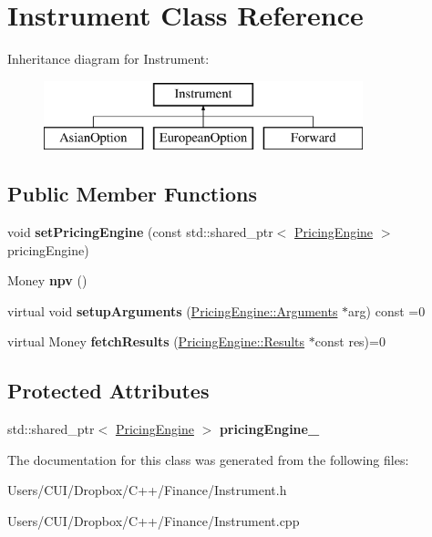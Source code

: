 \hypertarget{class_instrument}{}\section{Instrument Class Reference}
\label{class_instrument}
Inheritance diagram for Instrument\+:\begin{figure}[H]
\begin{center}
\leavevmode
\includegraphics[height=2.000000cm]{class_instrument}
\end{center}
\end{figure}
\subsection*{Public Member Functions}
\begin{DoxyCompactItemize}
\item 
\hypertarget{class_instrument_a47bdaa9390ab5e0616e8499a507c50cd}{}\label{class_instrument_a47bdaa9390ab5e0616e8499a507c50cd} 
void {\bfseries set\+Pricing\+Engine} (const std\+::shared\+\_\+ptr$<$ \hyperlink{class_pricing_engine}{Pricing\+Engine} $>$ pricing\+Engine)
\item 
\hypertarget{class_instrument_aa750f2ae95a21d65a073da3171e8d084}{}\label{class_instrument_aa750f2ae95a21d65a073da3171e8d084} 
Money {\bfseries npv} ()
\item 
\hypertarget{class_instrument_ac0f78fd32a360abde0c31b5bc01c7e67}{}\label{class_instrument_ac0f78fd32a360abde0c31b5bc01c7e67} 
virtual void {\bfseries setup\+Arguments} (\hyperlink{class_pricing_engine_1_1_arguments}{Pricing\+Engine\+::\+Arguments} $\ast$arg) const =0
\item 
\hypertarget{class_instrument_a381f093402f789ad7c0ffecd233167dc}{}\label{class_instrument_a381f093402f789ad7c0ffecd233167dc} 
virtual Money {\bfseries fetch\+Results} (\hyperlink{class_pricing_engine_1_1_results}{Pricing\+Engine\+::\+Results} $\ast$const res)=0
\end{DoxyCompactItemize}
\subsection*{Protected Attributes}
\begin{DoxyCompactItemize}
\item 
\hypertarget{class_instrument_a6fdd5548ccc944536ff73913d98bf598}{}\label{class_instrument_a6fdd5548ccc944536ff73913d98bf598} 
std\+::shared\+\_\+ptr$<$ \hyperlink{class_pricing_engine}{Pricing\+Engine} $>$ {\bfseries pricing\+Engine\+\_\+}
\end{DoxyCompactItemize}


The documentation for this class was generated from the following files\+:\begin{DoxyCompactItemize}
\item 
Users/\+C\+U\+I/\+Dropbox/\+C++/\+Finance/Instrument.\+h\item 
Users/\+C\+U\+I/\+Dropbox/\+C++/\+Finance/Instrument.\+cpp\end{DoxyCompactItemize}
